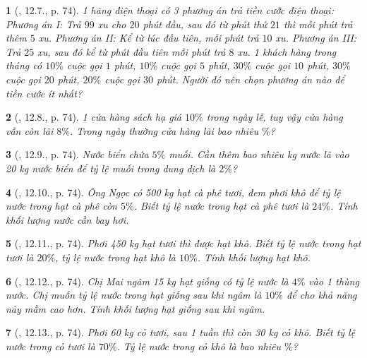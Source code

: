 \documentclass{article}
\newtheorem{baitoan}{}
\begin{document}
\begin{baitoan}[\cite{TLCT_THCS_Toan_6_so_hoc}, 12.7., p. 74]
	1 hãng điện thoại có 3 phương án trả tiền cước điện thoại: Phương án I: Trả $99$ xu cho $20$ phút đầu, sau đó từ phút thứ $21$ thì mỗi phút trả thêm $5$ xu. Phương án II: Kể từ lúc đầu tiên, mỗi phút trả $10$ xu. Phương án III: Trả $25$ xu, sau đó kể từ phút đầu tiên mỗi phút trả $8$ xu. 1 khách hàng trong tháng có $10\%$ cuộc gọi $1$ phút, $10\%$ cuộc gọi $5$ phút, $30\%$ cuộc gọi $10$ phút, $30\%$ cuộc gọi $20$ phút, $20\%$ cuộc gọi $30$ phút. Người đó nên chọn phương án nào để tiền cước ít nhất?
\end{baitoan}

\begin{baitoan}[\cite{TLCT_THCS_Toan_6_so_hoc}, 12.8., p. 74]
	1 cửa hàng sách hạ giá $10\%$ trong ngày lễ, tuy vậy cửa hàng vẫn còn lãi $8\%$. Trong ngày thường cửa hàng lãi bao nhiêu $\%$?
\end{baitoan}

\begin{baitoan}[\cite{TLCT_THCS_Toan_6_so_hoc}, 12.9., p. 74]
	Nước biển chứa $5\%$ muối. Cần thêm bao nhiêu {\rm kg} nước lã vào {\rm20 kg} nước biển để tỷ lệ muối trong dung dịch là $2\%$?
\end{baitoan}

\begin{baitoan}[\cite{TLCT_THCS_Toan_6_so_hoc}, 12.10., p. 74]
	Ông Ngọc có {\rm500 kg} hạt cà phê tươi, đem phơi khô để tỷ lệ nước trong hạt cà phê còn $5\%$. Biết tỷ lệ nước trong hạt cà phê tươi là $24\%$. Tính khối lượng nước cần bay hơi.
\end{baitoan}

\begin{baitoan}[\cite{TLCT_THCS_Toan_6_so_hoc}, 12.11., p. 74]
	Phơi {\rm450 kg} hạt tươi thì được hạt khô. Biết tỷ lệ nước trong hạt tươi là $20\%$, tỷ lệ nước trong hạt khô là $10\%$. Tính khối lượng hạt khô.
\end{baitoan}

\begin{baitoan}[\cite{TLCT_THCS_Toan_6_so_hoc}, 12.12., p. 74]
	Chị Mai ngâm {\rm15 kg} hạt giống có tỷ lệ nước là $4\%$ vào 1 thùng nước. Chị muốn tỷ lệ nước trong hạt giống sau khi ngâm là $10\%$ để cho khả năng nảy mầm cao hơn. Tính khối lượng hạt giống sau khi ngâm.
\end{baitoan}

\begin{baitoan}[\cite{TLCT_THCS_Toan_6_so_hoc}, 12.13., p. 74]
	Phơi {\rm60 kg} cỏ tươi, sau 1 tuần thì còn {\rm30 kg} cỏ khô. Biết tỷ lệ nước trong cỏ tươi là $70\%$. Tỷ lệ nước trong cỏ khô là bao nhiêu $\%$?
\end{baitoan}
\end{document}
